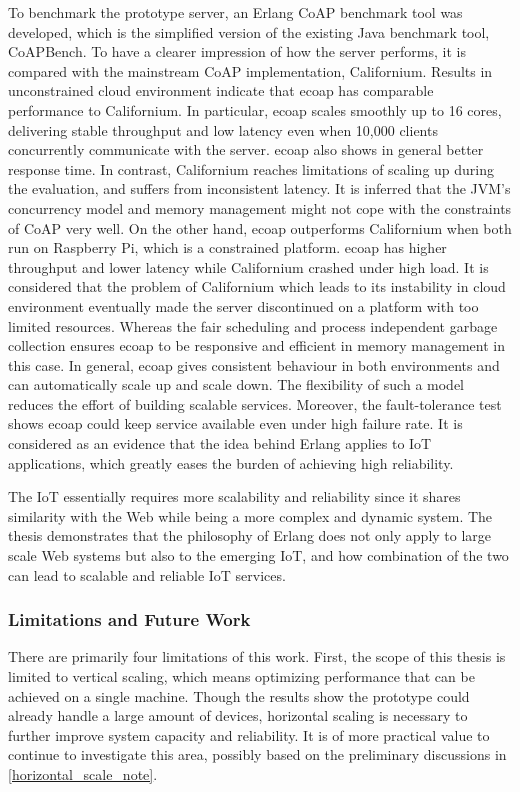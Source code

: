 To benchmark the prototype server, an Erlang CoAP benchmark tool was developed, which is the simplified version of the existing Java benchmark tool, CoAPBench. To have a clearer impression of how the server performs, it is compared with the mainstream CoAP implementation, Californium. Results in unconstrained cloud environment indicate that ecoap has comparable performance to Californium. In particular, ecoap scales smoothly up to 16 cores, delivering stable throughput and low latency even when 10,000 clients concurrently communicate with the server. ecoap also shows in general better response time. In contrast, Californium reaches limitations of scaling up during the evaluation, and suffers from inconsistent latency. It is inferred that the JVM's concurrency model and memory management might not cope with the constraints of CoAP very well. On the other hand, ecoap outperforms Californium when both run on Raspberry Pi, which is a constrained platform. ecoap has higher throughput and lower latency while Californium crashed under high load. It is considered that the problem of Californium which leads to its instability in cloud environment eventually made the server discontinued on a platform with too limited resources. Whereas the fair scheduling and process independent garbage collection ensures ecoap to be responsive and efficient in memory management in this case. In general, ecoap gives consistent behaviour in both environments and can automatically scale up and scale down. The flexibility of such a model reduces the effort of building scalable services. Moreover, the fault-tolerance test 
shows ecoap could keep service available even under high failure rate. It is considered as an evidence that the idea behind Erlang applies to IoT applications, which greatly eases the burden of achieving high reliability.

The IoT essentially requires more scalability and reliability since it shares similarity with the Web while being a more complex and dynamic system. The thesis demonstrates that the philosophy of Erlang does not only apply to large scale Web systems but also to the emerging IoT, and how combination of the two can lead to scalable and reliable IoT services. 


\subsubsection{Limitations and Future Work}

There are primarily four limitations of this work. First, the scope of this thesis is limited to vertical scaling, which means optimizing performance that can be achieved on a single machine. Though the results show the prototype could already handle a large amount of devices, horizontal scaling is necessary to further improve system capacity and reliability. It is of more practical value to continue to investigate this area, possibly based on the preliminary discussions in \autoref{horizontal_scale_note}. 

